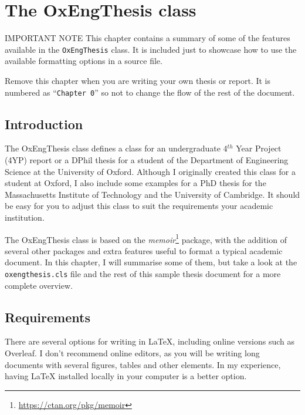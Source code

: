 \setcounter{chapter}{-1}
\chapter{The OxEngThesis \latex class}



\begin{OxWarningBox}{IMPORTANT NOTE}
This chapter contains a summary of some of the features available in the \verb|OxEngThesis| class. It is included just to showcase how to use the available formatting options in a \latex source file.

Remove this chapter when you are writing your own thesis or report. It is numbered as ``\verb|Chapter 0|'' so not to change the flow of the rest of the document.
\end{OxWarningBox}


\section{Introduction}


The OxEngThesis class defines a \latex class for an undergraduate 4$^{th}$ Year Project (4YP) report or a DPhil thesis for a student of the Department of Engineering Science at the University of Oxford. Although I originally created this class for a student at Oxford, I also include some examples for a PhD thesis for the Massachusetts Institute of Technology and the University of Cambridge. It should be easy for you to adjust this class to suit the requirements your academic institution.

The OxEngThesis class is based on the \textit{memoir}\footnote{\url{https://ctan.org/pkg/memoir}} package, with the addition of several other packages and extra features useful to format a typical academic document. In this chapter, I will summarise some of them, but take a look at the \verb|oxengthesis.cls| file and the rest of this sample thesis document for a more complete overview.


\section{Requirements}


There are several options for writing in LaTeX, including online versions such as Overleaf. I don't recommend online editors, as you will be writing long documents with several figures, tables and other elements. In my experience, having LaTeX installed locally in your computer is a better option.

